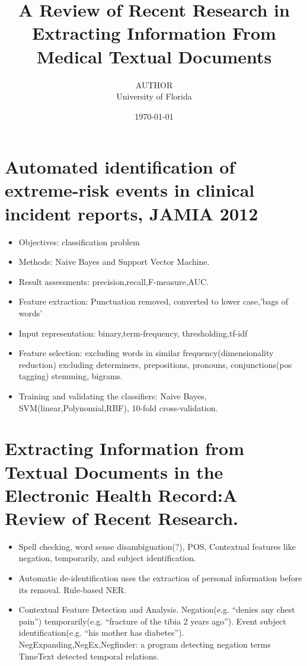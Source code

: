\documentclass[pdftext,twoside,11pt]{article}
\title{A Review of Recent Research in Extracting Information From Medical Textual Documents}
\author{AUTHOR\\
  University of Florida\\
}
\date{\today}
\begin{document}
\maketitle



\section{Automated identification of extreme-risk events in clinical incident reports, JAMIA 2012}
\label{sec:intro} 
\begin{itemize}
\item Objectives: classification problem
\item Methods: Naive Bayes and Support Vector Machine. 
\item Result assessments: precision,recall,F-measure,AUC.
\item Feature extraction:  Punctuation removed, converted to lower case,'bags of words'
\item Input representation: binary,term-frequency, thresholding,tf-idf
\item Feature selection: excluding words in similar frequency(dimensionality reduction)
                              excluding determiners, prepositions, pronouns, conjunctions(pos tagging)
                              stemming, bigrams.
\item Training and validating the classifiers: Naive Bayes, SVM(linear,Polynomial,RBF), 10-fold cross-validation.
\end{itemize}
\section{Extracting Information from Textual Documents
 in the Electronic Health Record:A Review of Recent Research.}
\label{sec:intro} 
\begin{itemize}
\item Spell checking, word sense disambiguation(?), POS, Contextual features like negation, temporarily, and subject identification.

\item Automatic de-identification uses the extraction of personal information before its removal. Rule-based NER.
\item Contextual Feature Detection and Analysis.
             Negation(e.g. “denies any chest pain”) temporarily(e.g. “fracture of the tibia 2 years ago”). Event subject identification(e.g. “his mother has diabetes”). 
                          NegExpanding,NegEx,Negfinder: a program detecting negation terms 
                          TimeText detected temporal relations. 
\end{itemize}
\end{document}
